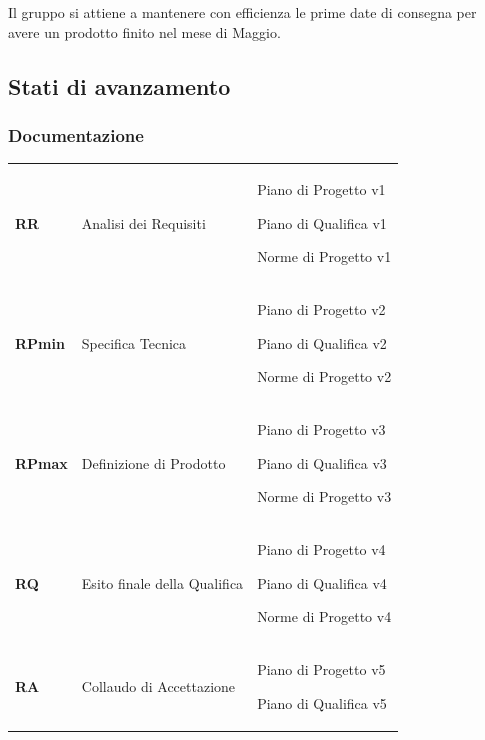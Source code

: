 \documentclass[12pt,a4paper,titlepage]{article}
\begin{document}
	Il gruppo si attiene a mantenere con efficienza le prime date di consegna per avere un prodotto finito nel mese di Maggio.
	
	\subsection{Stati di avanzamento}
	\subsubsection{Documentazione}
	\small
	{\renewcommand\arraystretch{1.2}
		\begin{tabular}{|p{2cm}|p{5cm}|p{5cm}|}
			\hline
			\textbf{RR} & Analisi dei Requisiti & \begin{trivlist}
				\item Piano di Progetto v1
				\item Piano di Qualifica v1
				\item Norme di Progetto v1
			\end{trivlist}
			\\
			\textbf{RPmin} & Specifica Tecnica &  \begin{trivlist}
				\item Piano di Progetto v2
				\item Piano di Qualifica v2
				\item Norme di Progetto v2
			\end{trivlist}
			\\
			\textbf{RPmax} & Definizione di Prodotto &  \begin{trivlist}
				\item Piano di Progetto v3
				\item Piano di Qualifica v3
				\item Norme di Progetto v3
			\end{trivlist} \\
			\textbf{RQ} & Esito finale della Qualifica &  \begin{trivlist}
				\item Piano di Progetto v4
				\item Piano di Qualifica v4
				\item Norme di Progetto v4
			\end{trivlist}\\
			\textbf{RA} & Collaudo di Accettazione & \begin{trivlist}
				\item Piano di Progetto v5
				\item Piano di Qualifica v5
			\end{trivlist}\\ 
			
			\hline
	\end{tabular}}
	
\end{document}
